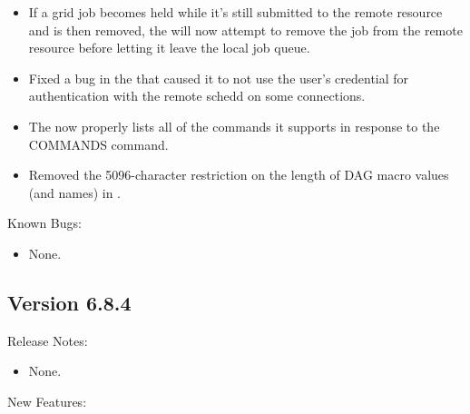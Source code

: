 \begin{itemize}
\item If a grid job becomes held while it's still submitted to the remote
resource and is then removed, the  will now attempt
to remove the job from the remote resource before letting it leave the
local job queue.

\item Fixed a bug in the  that caused it to not use the 
user's credential for authentication with the remote schedd on some 
connections.

\item The  now properly lists all of the commands it
supports in response to the COMMANDS command.

\item Removed the 5096-character restriction on the length of DAG
macro values (and names) in .

\end{itemize}

\noindent Known Bugs:

\begin{itemize}

\item None.

\end{itemize}


\subsection*{\label{sec:New-6-8-4}Version 6.8.4}

\noindent Release Notes:

\begin{itemize}

\item None.

\end{itemize}


\noindent New Features:

